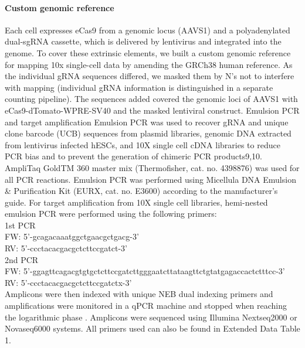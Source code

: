 \paragraph{Custom genomic reference}
Each cell expresses eCas9 from a genomic locus (AAVS1) and a polyadenylated dual-sgRNA cassette, which is delivered by lentivirus and integrated into the genome. To cover these extrinsic elements, we built a custom genomic reference for mapping 10x single-cell data by amending the GRCh38 human reference. As the individual gRNA sequences differed, we masked them by N’s not to interfere with mapping (individual gRNA information is distinguished in a separate counting pipeline). The sequences added covered the genomic loci of AAVS1 with eCas9-dTomato-WPRE-SV40 and the masked lentiviral construct.
Emulsion PCR and target amplification
Emulsion PCR was used to recover gRNA and unique clone barcode (UCB) sequences from plasmid libraries, genomic DNA extracted from lentivirus infected hESCs, and 10X single cell cDNA libraries to reduce PCR bias and to prevent the generation of chimeric PCR products9,10. AmpliTaq GoldTM 360 master mix (Thermofisher, cat. no. 4398876) was used for all PCR reactions. Emulsion PCR was performed using Micellula DNA Emulsion \& Purification Kit (EURX, cat. no. E3600) according to the manufacturer's guide. For target amplification from 10X single cell libraries, hemi-nested emulsion PCR were performed using the following primers: \\
1st PCR \\
FW: 5’-gcagacaaatggctgaacgctgacg-3’ \\
RV: 5’-ccctacacgacgctcttccgatct-3’ \\
2nd PCR \\
FW: 5’-ggagttcagacgtgtgctcttccgatcttgggaatcttataagttctgtatgagaccactctttcc-3’ \\
RV: 5’-ccctacacgacgctcttccgatctx-3’ \\
Amplicons were then indexed with unique NEB dual indexing primers and amplifications were monitored in a qPCR machine and stopped when reaching the logarithmic phase . Amplicons were sequenced using Illumina Nextseq2000 or Novaseq6000 systems. All primers used can also be found in Extended Data Table 1. 

